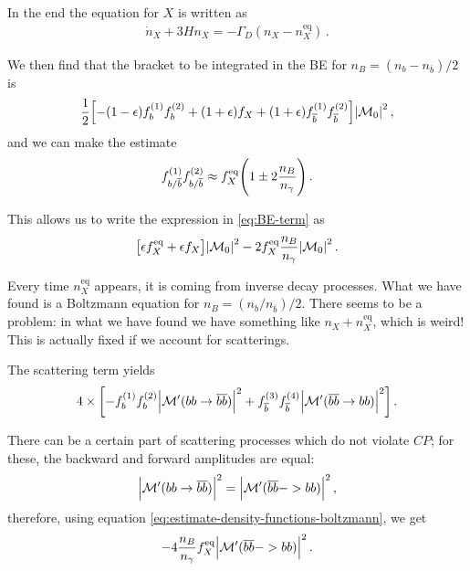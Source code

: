 \documentclass[main.tex]{subfiles}
\begin{document}
In the end the equation for \(X\) is written as 
%
\begin{align}
\dot{n}_X + 3 H n_X = - \Gamma _D (n_X - n_X^{\text{eq}}) 
\,.
\end{align}

We then find that the bracket to be integrated in the BE for \(n_B = (n_b - n_{\overline{b}}) / 2\) is
%
\begin{align} \label{eq:BE-term}
\frac{1}{2} \qty[- (1-\epsilon ) f_b^{(1)} f_b^{(2)} + (1 + \epsilon ) f_X 
+ (1 + \epsilon ) f_{\overline{b}}^{(1)} f_{\overline{b}}^{(2)} ]\abs{\mathcal{M}_0}^2
\,,
\end{align}
%
and we can make the estimate 
%
\begin{align} \label{eq:estimate-density-functions-boltzmann}
f_{b/\overline{b}}^{(1)}
f_{b/\overline{b}}^{(2)} \approx 
f_X^{\text{eq}} \qty(1 \pm 2 \frac{n_B}{n_\gamma })
\,.
\end{align}

This allows us to write the expression in \eqref{eq:BE-term} as 
%
\begin{align}
\qty[\epsilon f_X^{\text{eq}} + \epsilon f_X ] \abs{\mathcal{M}_0}^2
- 2 f_X^{\text{eq}} \frac{n_B}{n_\gamma } \abs{\mathcal{M}_0}^2
\,.
\end{align}

Every time \(n_X^{\text{eq}}\) appears, it is coming from inverse decay processes. 
What we have found is a Boltzmann equation for \(n_B = (n_b / n_{\overline{b}}) / 2\). 
There seems to be a problem: in what we have found we have something like \(n_X + n_X^{\text{eq}}\), which is weird! 
This is actually fixed if we account for scatterings. 

The scattering term yields 
%
\begin{align}
4 \times \qty[
     - f_b^{(1)} f_b^{(2)} \abs{\mathcal{M}' (bb \to \overline{b} \overline{b})}^2 + 
     f_{\overline{b}}^{(3)} f_{\overline{b}}^{(4)} \abs{\mathcal{M}' (\overline{b} \overline{b} \to bb)}^2  
     ]
\,.
\end{align}

There can be a certain part of scattering processes which do not violate \(CP\); for these, the backward and forward amplitudes are equal: 
%
\begin{align}
\abs{\mathcal{M}' (bb \to \overline{b} \overline{b})}^2
=
\abs{\mathcal{M}' (\overline{b} \overline{b} -> bb)}^2
\,,
\end{align}
%
therefore, using equation \eqref{eq:estimate-density-functions-boltzmann}, we get 
%
\begin{align}
- 4 \frac{n_B}{n_\gamma } f_X^{\text{eq}} \abs{\mathcal{M}' (\overline{b} \overline{b} -> bb)}^2
\,.
\end{align}
\end{document}
